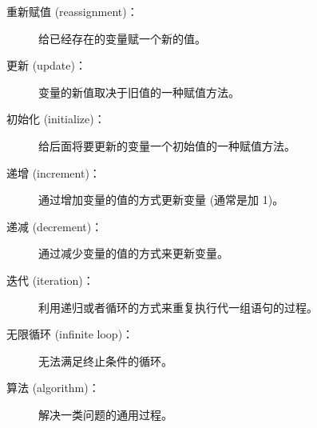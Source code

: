 \begin{description}


\item[重新赋值 (reassignment)：] 给已经存在的变量赋一个新的值。


\item[更新 (update)：] 变量的新值取决于旧值的一种赋值方法。


\item[初始化 (initialize)：] 给后面将要更新的变量一个初始值的一种赋值方法。


\item[递增 (increment)：] 通过增加变量的值的方式更新变量 (通常是加 1)。


\item[递减 (decrement)：] 通过减少变量的值的方式来更新变量。


\item[迭代 (iteration)：] 利用递归或者循环的方式来重复执行代一组语句的过程。


\item[无限循环 (infinite loop)：] 无法满足终止条件的循环。


\item[算法 (algorithm)：] 解决一类问题的通用过程。

\end{description}

